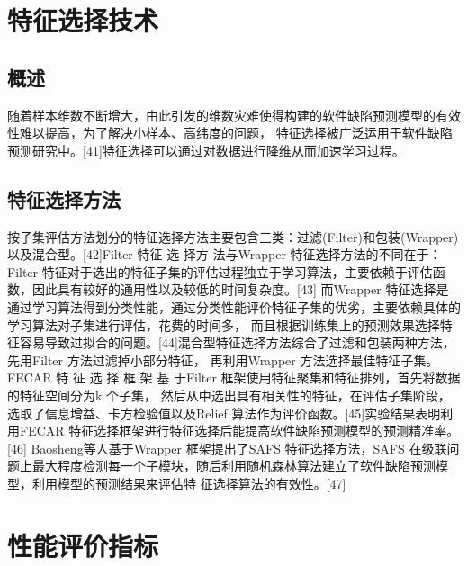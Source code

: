\documentclass[12pt, a4paper]{article}
\begin{document}
\section{特征选择技术}

\subsection{概述}

随着样本维数不断增大，由此引发的维数灾难使得构建的软件缺陷预测模型的有效性难以提高，为了解决小样本、高纬度的问题，
特征选择被广泛运用于软件缺陷预测研究中。[41]特征选择可以通过对数据进行降维从而加速学习过程。

\subsection{特征选择方法}

按子集评估方法划分的特征选择方法主要包含三类：过滤(Filter)和包装(Wrapper)以及混合型。[42]Filter 特征 选 择方 法与Wrapper 特征选择方法的不同在于：
Filter 特征对于选出的特征子集的评估过程独立于学习算法，主要依赖于评估函数，因此具有较好的通用性以及较低的时间复杂度。[43]
而Wrapper 特征选择是通过学习算法得到分类性能，通过分类性能评价特征子集的优劣，主要依赖具体的学习算法对子集进行评估，花费的时间多，
而且根据训练集上的预测效果选择特征容易导致过拟合的问题。[44]混合型特征选择方法综合了过滤和包装两种方法，先用Filter 方法过滤掉小部分特征，
再利用Wrapper 方法选择最佳特征子集。FECAR 特 征 选 择 框 架 基 于Filter 框架使用特征聚集和特征排列，首先将数据的特征空间分为k 个子集，
然后从中选出具有相关性的特征，在评估子集阶段，选取了信息增益、卡方检验值以及Relief 算法作为评价函数。[45]实验结果表明利用FECAR 特征选择框架进行特征选择后能提高软件缺陷预测模型的预测精准率。[46]
Baosheng等人基于Wrapper 框架提出了SAFS 特征选择方法，SAFS 在级联问题上最大程度检测每一个子模块，随后利用随机森林算法建立了软件缺陷预测模型，利用模型的预测结果来评估特
征选择算法的有效性。[47]

\section{性能评价指标}
\end{document}

